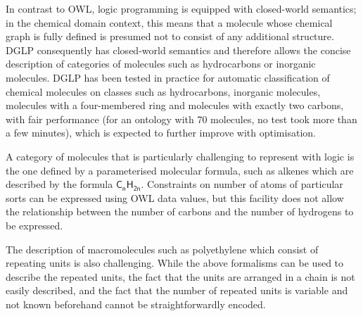 \documentclass[10pt]{bmc_article}
\newenvironment{bmcformat}{\baselineskip20pt\sloppy\setboolean{publ}{false}}{\baselineskip20pt\sloppy}
\begin{document}
\begin{bmcformat}
In contrast to OWL, logic programming is equipped with closed-world semantics; in the chemical domain context, this means that a molecule whose chemical graph is fully defined is presumed not to consist of any additional structure. DGLP \cite{magka2011} consequently has closed-world semantics and therefore allows the concise description of categories of molecules such as hydrocarbons or inorganic molecules. DGLP has been tested in practice for automatic classification of chemical molecules on classes such as hydrocarbons, inorganic molecules, molecules with a four-membered ring and molecules with exactly two carbons, with fair performance (for an ontology with 70 molecules, no test took more than a few minutes), which is expected to further improve with optimisation. %

A category of molecules that is particularly challenging to represent with logic is the one defined by a parameterised molecular formula, such as alkenes which are described by the formula $\mathsf{C_nH_{2n}}$. Constraints on number of atoms of particular sorts can be expressed using OWL data values, but this facility does not allow the relationship between the number of carbons and the number of hydrogens to be expressed.  

The description of macromolecules such as polyethylene which consist of repeating units is also challenging. While the above formalisms can be used to describe the repeated units, the fact that the units are arranged in a chain is not easily described, and the fact that the number of repeated units is variable and not known beforehand cannot be straightforwardly encoded. %

% 




\end{bmcformat}
\end{document}
